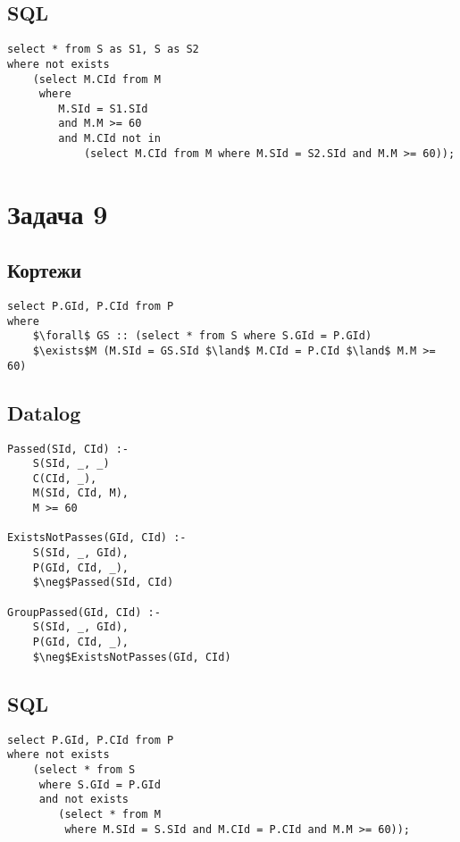 \documentclass{article}
\begin{document}
\subsection{SQL}
\begin{lstlisting}[mathescape=true]
select * from S as S1, S as S2
where not exists
    (select M.CId from M
     where
        M.SId = S1.SId
        and M.M >= 60
        and M.CId not in
            (select M.CId from M where M.SId = S2.SId and M.M >= 60));
\end{lstlisting}



\section{Задача 9}

\subsection{Кортежи}
\begin{lstlisting}[mathescape=true]
select P.GId, P.CId from P
where
    $\forall$ GS :: (select * from S where S.GId = P.GId)
    $\exists$M (M.SId = GS.SId $\land$ M.CId = P.CId $\land$ M.M >= 60)
\end{lstlisting}

\subsection{Datalog}
\begin{lstlisting}[mathescape=true]
Passed(SId, CId) :-
    S(SId, _, _)
    C(CId, _),
    M(SId, CId, M),
    M >= 60

ExistsNotPasses(GId, CId) :-
    S(SId, _, GId),
    P(GId, CId, _),
    $\neg$Passed(SId, CId)

GroupPassed(GId, CId) :-
    S(SId, _, GId),
    P(GId, CId, _),
    $\neg$ExistsNotPasses(GId, CId)
\end{lstlisting}


\subsection{SQL}
\begin{lstlisting}[mathescape=true]
select P.GId, P.CId from P
where not exists
    (select * from S
     where S.GId = P.GId
     and not exists
        (select * from M
         where M.SId = S.SId and M.CId = P.CId and M.M >= 60));
\end{lstlisting}
\end{document}
